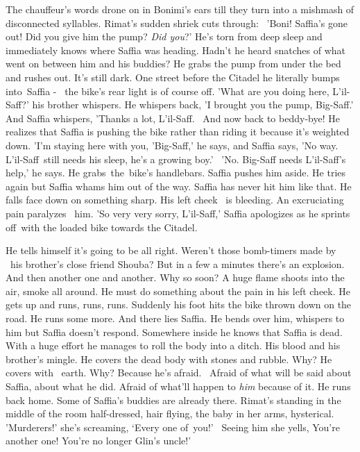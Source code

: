 \documentclass[letterpaper]{article}
\begin{document}
The chauffeur's words drone on in Bonimi's ears till they turn into a mishmash of disconnected syllables. Rimat's sudden
shriek cuts through: \ {}'Boni! Saffia's gone out! Did you give him the pump? \textit{Did you}?' He's torn from deep
sleep and immediately knows where Saffia was heading. Hadn't he heard snatches of what went on between him and his
buddies? He grabs the pump from under the bed and rushes out. It's still dark. One street before the Citadel he
literally bumps into~Saffia - \ the bike's rear light is of course off. 'What are you doing here, L'il-Saff?' his
brother whispers. He whispers back, 'I brought you the pump, Big-Saff.' And Saffia whispers, 'Thanks a lot, L'il-Saff.
~And now back to beddy-bye!{\textquotedbl} He realizes that Saffia is pushing the bike rather than riding it because
it's weighted down. 'I'm staying here with you, 'Big-Saff,' he says, and Saffia says, 'No way. L'il-Saff~still needs
his sleep, he's a growing boy.' \ {}'No. Big-Saff needs L'il-Saff's help,' he says. He grabs~the~bike's handlebars.
Saffia pushes him aside. He tries again but Saffia whams him out of the way. Saffia has never hit him like that. He
falls face down on something sharp. His left cheek{ \ }is bleeding. An excruciating pain paralyzes
\ him. 'So very very sorry, L'il-Saff,' Saffia apologizes as he sprints off~with the loaded bike towards the Citadel.

He tells himself it's going to be all right. Weren't those bomb-timers made by \ his brother's close friend Shouba? But
in a few a minutes there's an explosion. And then another one and another. Why so soon? A huge flame shoots into the
air, smoke all around. He must do something about the pain in his left cheek. He gets up and runs, runs, runs. Suddenly
his foot hits the bike thrown down on the road. He runs some more. And there lies Saffia. He bends over him, whispers
to him but Saffia doesn't respond. Somewhere inside he knows that Saffia is dead. With a huge effort he manages to roll
the body into a ditch. His blood and his brother's mingle{. }He covers the dead body with stones and
rubble. Why? He covers with \ earth. Why? Because he's afraid. ~Afraid of what will be said about Saffia, about what he
did. Afraid of what'll happen to \textit{him} because of it. He runs back home. Some of Saffia's buddies are already
there. Rimat's standing in the middle of the room half-dressed, hair flying, the baby in her arms, hysterical.
'Murderers!' she's screaming, `Every one of~you!' \ Seeing him she yells, {\textquotedbl}You're another one! You're no
longer Glin's uncle!'
\end{document}
